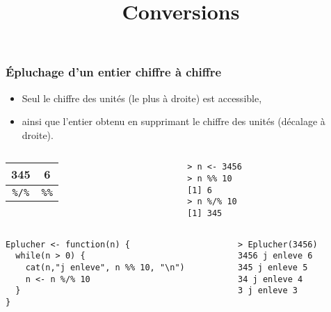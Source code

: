 \documentclass[10pt]{beamer}
\title{Conversions}
\begin{document}
\maketitle



\begin{frame}[fragile]
  \frametitle{Épluchage d'un entier chiffre à chiffre}

  \begin{itemize}
  \item Seul le chiffre des unités (le plus à droite) est accessible, 
  \item ainsi que l'entier obtenu en supprimant le chiffre des unités (décalage à droite).
  \end{itemize}
 
  \begin{columns}[c]
    \begin{column}{0.6\textwidth}
      \begin{center}
  \begin{tabular}{c|c}
    \toprule
    345 & 6 \\
    \midrule
    \texttt{\%/\%} &     \texttt{\%\%} \\
    \bottomrule
  \end{tabular}
\end{center}  
\end{column}
\begin{column}{0.4\textwidth}
  \begin{lstlisting}
> n <- 3456
> n %% 10
[1] 6
> n %/% 10
[1] 345
\end{lstlisting}
\end{column}
\end{columns}



\begin{columns}[t]
\begin{column}{0.62\textwidth}
\begin{lstlisting}[style=editor]
Eplucher <- function(n) {
  while(n > 0) {
    cat(n,"j enleve", n %% 10, "\n")
    n <- n %/% 10
  }
}  
\end{lstlisting}
\end{column}
\begin{column}{0.38\textwidth}
\begin{lstlisting}
> Eplucher(3456)
3456 j enleve 6 
345 j enleve 5 
34 j enleve 4 
3 j enleve 3   
\end{lstlisting}
\end{column}
\end{columns}

\end{frame}
\end{document}
